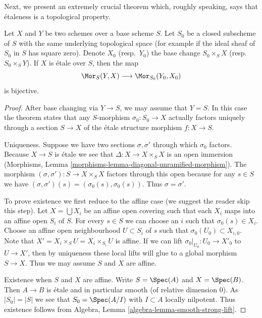 \noindent
Next, we present an extremely crucial theorem which, roughly speaking, says
that \'etaleness is a topological property.

\begin{theorem}
\label{theorem-etale-topological}
Let $X$ and $Y$ be two schemes over a base scheme $S$. Let $S_0$ be a closed
subscheme of $S$ with the same underlying topological space
(for example if the ideal sheaf of $S_0$ in $S$ has square zero).
Denote $X_0$ (resp.\ $Y_0$) the base change $S_0 \times_S X$
(resp.\ $S_0 \times_S Y$).
If $X$ is \'etale over $S$, then the map
$$
\Mor_S(Y, X) \longrightarrow \Mor_{S_0}(Y_0, X_0)
$$
is bijective.
\end{theorem}

\begin{proof}
After base changing via $Y \to S$, we may assume that $Y = S$.
In this case the theorem states that any $S$-morphism $\sigma_0 : S_0 \to X$
actually factors uniquely through a section $S \to X$ of the
\'etale structure morphism $f : X \to S$.

\medskip\noindent
Uniqueness. Suppose we have two sections $\sigma, \sigma'$
through which $\sigma_0$ factors. Because $X \to S$ is \'etale
we see that $\Delta : X \to X \times_S X$ is an open immersion
(Morphisms, Lemma \ref{morphisms-lemma-diagonal-unramified-morphism}).
The morphism $(\sigma, \sigma') : S \to X \times_S X$ factors
through this open because for any $s \in S$ we have
$(\sigma, \sigma')(s) = (\sigma_0(s), \sigma_0(s))$. Thus
$\sigma = \sigma'$.

\medskip\noindent
To prove existence we first reduce to the affine case
(we suggest the reader skip this step).
Let $X = \bigcup X_i$ be an affine open covering such
that each $X_i$ maps into an affine open $S_i$ of $S$.
For every $s \in S$ we can choose an $i$ such that
$\sigma_0(s) \in X_i$.
Choose an affine open neighbourhood $U \subset S_i$ of $s$
such that $\sigma_0(U_0) \subset X_{i, 0}$. Note that
$X' = X_i \times_S U = X_i \times_{S_i} U$ is affine.
If we can lift $\sigma_0|_{U_0} : U_0 \to X'_0$ to
$U \to X'$, then by uniqueness these local lifts will glue
to a global morphism $S \to X$. Thus we may assume $S$ and
$X$ are affine.

\medskip\noindent
Existence when $S$ and $X$ are affine. Write $S = \Spec(A)$
and $X = \Spec(B)$. Then $A \to B$ is \'etale and in particular
smooth (of relative dimension $0$). As $|S_0| = |S|$ we see
that $S_0 = \Spec(A/I)$ with $I \subset A$ locally nilpotent.
Thus existence follows from
Algebra, Lemma \ref{algebra-lemma-smooth-strong-lift}.
\end{proof}

